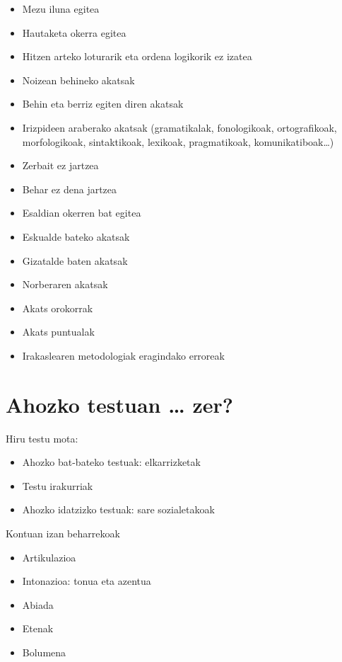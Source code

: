 \documentclass[
]{book}
\providecommand{\tightlist}{%
  \setlength{\itemsep}{0pt}\setlength{\parskip}{0pt}}
\begin{document}
\begin{itemize}
\tightlist
\item
  Mezu iluna egitea
\item
  Hautaketa okerra egitea
\item
  Hitzen arteko loturarik eta ordena logikorik ez izatea
\item
  Noizean behineko akatsak
\item
  Behin eta berriz egiten diren akatsak
\item
  Irizpideen araberako akatsak (gramatikalak, fonologikoak, ortografikoak, morfologikoak, sintaktikoak, lexikoak, pragmatikoak, komunikatiboak\ldots)
\item
  Zerbait ez jartzea
\item
  Behar ez dena jartzea
\item
  Esaldian okerren bat egitea
\item
  Eskualde bateko akatsak
\item
  Gizatalde baten akatsak
\item
  Norberaren akatsak
\item
  Akats orokorrak
\item
  Akats puntualak
\item
  Irakaslearen metodologiak eragindako erroreak
\end{itemize}

\hypertarget{ahozko-testuan-zer}{%
\section{Ahozko testuan \ldots{} zer?}\label{ahozko-testuan-zer}}

Hiru testu mota:

\begin{itemize}
\tightlist
\item
  Ahozko bat-bateko testuak: elkarrizketak
\item
  Testu irakurriak
\item
  Ahozko idatzizko testuak: sare sozialetakoak
\end{itemize}

Kontuan izan beharrekoak

\begin{itemize}
\tightlist
\item
  Artikulazioa
\item
  Intonazioa: tonua eta azentua
\item
  Abiada
\item
  Etenak
\item
  Bolumena
\end{itemize}
\end{document}
